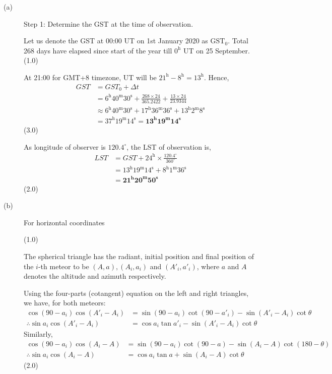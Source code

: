 \begin{description}
\item[(a)] Step 1: Determine the GST at the time of observation.

  Let us denote the GST at 00:00 UT on 1st January 2020 as
  $\mathrm{GST}_0$. Total 268 days have elapsed since start of the year till
  $0^{\mathrm{h}}$ UT on 25 September. \hfill(1.0)

  At 21:00 for GMT+8 timezone, UT will be
  $21^{\mathrm{h}} - 8^{\mathrm{h}} = 13^{\mathrm{h}}$. Hence,
  \begin{align*}
    GST &= GST_0 + \Delta t\\
        &= 6^{\mathrm{h}}40^{\mathrm{m}}30^{\mathrm{s}}
           + \frac{268 \times 24}{365.2422} + \frac{13 \times 24}{23.9344}\\
        &\approx 6^{\mathrm{h}}40^{\mathrm{m}}30^{\mathrm{s}}
           + 17^{\mathrm{h}}36^{\mathrm{m}}36^{\mathrm{s}}
           + 13^{\mathrm{h}}2^{\mathrm{m}}8^{\mathrm{s}}\\
        &= 37^{\mathrm{h}}19^{\mathrm{m}}14^{\mathrm{s}}
         = \mathbf{13^{h}19^{m}14^{s}}
  \end{align*}
  \hfill(3.0)

  As longitude of observer is $120.4^\circ$, the LST of observation is,
  \begin{align*}
    LST &= GST + 24^{\mathrm{h}} \times \frac{120.4^\circ}{360^\circ}\\
        &= 13^{\mathrm{h}}19^{\mathrm{m}}14^{\mathrm{s}}
           + 8^{\mathrm{h}}1^{\mathrm{m}}36^{\mathrm{s}}\\
        &= \mathbf{21^{h}20^{m}50^{s}}
  \end{align*}
  \hfill(2.0)

\item[(b)] For horizontal coordinates

  \hfill(1.0)

  The spherical triangle has the radiant, initial position and final position
  of the $i$-th meteor to be $(A, a), (A_i, a_i)$ and $(A'_i, a'_i)$, where $a$
  and $A$ denotes the altitude and azimuth respectively.

  Using the four-parts (cotangent) equation on the left and right triangles, we
  have, for both meteors:
  \begin{align*}
    \cos(90 - a_i)\cos(A'_i - A_i)
      &= \sin(90 - a_i)\cot(90 - a'_i) - \sin(A'_i - A_i)\cot\theta\\
    \therefore \sin a_i \cos(A'_i - A_i)
      &= \cos a_i \tan a'_i - \sin(A'_i - A_i)\cot\theta
  \end{align*}
  Similarly,
  \begin{align*}
    \cos(90 - a_i)\cos(A_i - A)
      &= \sin(90 - a_i)\cot(90 - a) - \sin(A_i - A)\cot(180 - \theta)\\
    \therefore \sin a_i \cos(A_i - A)
      &= \cos a_i \tan a + \sin(A_i - A)\cot\theta
  \end{align*}
  \hfill(2.0)


\end{description}
